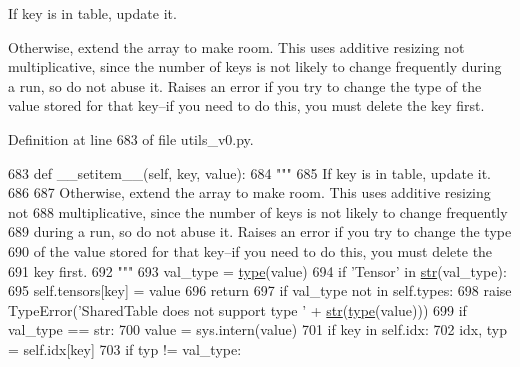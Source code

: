 \begin{DoxyVerb}If key is in table, update it.

Otherwise, extend the array to make room. This uses additive resizing not
multiplicative, since the number of keys is not likely to change frequently
during a run, so do not abuse it. Raises an error if you try to change the type
of the value stored for that key--if you need to do this, you must delete the
key first.
\end{DoxyVerb}
 

Definition at line 683 of file utils\+\_\+v0.\+py.


\begin{DoxyCode}
683     \textcolor{keyword}{def }\_\_setitem\_\_(self, key, value):
684         \textcolor{stringliteral}{"""}
685 \textcolor{stringliteral}{        If key is in table, update it.}
686 \textcolor{stringliteral}{}
687 \textcolor{stringliteral}{        Otherwise, extend the array to make room. This uses additive resizing not}
688 \textcolor{stringliteral}{        multiplicative, since the number of keys is not likely to change frequently}
689 \textcolor{stringliteral}{        during a run, so do not abuse it. Raises an error if you try to change the type}
690 \textcolor{stringliteral}{        of the value stored for that key--if you need to do this, you must delete the}
691 \textcolor{stringliteral}{        key first.}
692 \textcolor{stringliteral}{        """}
693         val\_type = \hyperlink{namespaceparlai_1_1agents_1_1tfidf__retriever_1_1build__tfidf_ad5dfae268e23f506da084a9efb72f619}{type}(value)
694         \textcolor{keywordflow}{if} \textcolor{stringliteral}{'Tensor'} \textcolor{keywordflow}{in} \hyperlink{namespacegenerate__task__READMEs_a5b88452ffb87b78c8c85ececebafc09f}{str}(val\_type):
695             self.tensors[key] = value
696             \textcolor{keywordflow}{return}
697         \textcolor{keywordflow}{if} val\_type \textcolor{keywordflow}{not} \textcolor{keywordflow}{in} self.types:
698             \textcolor{keywordflow}{raise} TypeError(\textcolor{stringliteral}{'SharedTable does not support type '} + \hyperlink{namespacegenerate__task__READMEs_a5b88452ffb87b78c8c85ececebafc09f}{str}(\hyperlink{namespaceparlai_1_1agents_1_1tfidf__retriever_1_1build__tfidf_ad5dfae268e23f506da084a9efb72f619}{type}(value)))
699         \textcolor{keywordflow}{if} val\_type == str:
700             value = sys.intern(value)
701         \textcolor{keywordflow}{if} key \textcolor{keywordflow}{in} self.idx:
702             idx, typ = self.idx[key]
703             \textcolor{keywordflow}{if} typ != val\_type:

\end{DoxyCode}
